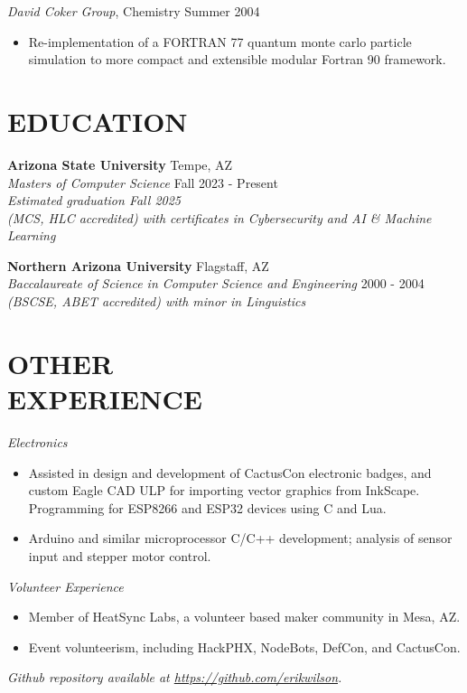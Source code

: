 \documentclass[line,margin]{res}
\begin{document}
\begin{resume}
          {\sl David Coker Group}, Chemistry \hfill Summer 2004
          \begin{itemize} \itemsep -2pt
          \item
            Re-implementation of a FORTRAN 77 quantum monte carlo particle simulation to more compact and extensible modular Fortran 90 framework.
          \end{itemize}

  \section{EDUCATION}
          {\bf Arizona State University} \hfill Tempe, AZ\\
          {\sl Masters of Computer Science} \hfill Fall 2023 - Present\\
          {\sl Estimated graduation Fall 2025}\\
          {\sl (MCS, HLC accredited) with certificates in Cybersecurity and AI \& Machine Learning}

          {\bf Northern Arizona University} \hfill Flagstaff, AZ\\
          {\sl Baccalaureate of Science in Computer Science and Engineering} \hfill 2000 - 2004\\
          {\sl (BSCSE, ABET accredited) with minor in Linguistics}

  \section{OTHER\\EXPERIENCE}
          \emph{Electronics}
          \begin{itemize} \itemsep -2pt
          \item
            Assisted in design and development of CactusCon electronic badges, and custom Eagle CAD ULP for importing
            vector graphics from InkScape. Programming for ESP8266 and ESP32 devices using C and Lua.
          \item
            Arduino and similar microprocessor C/C++ development; analysis of sensor input and stepper motor control.
          \end{itemize}

          \emph{Volunteer Experience}
          \begin{itemize} \itemsep -2pt %
          \item
            Member of HeatSync Labs, a volunteer based maker community in Mesa, AZ.
          \item
            Event volunteerism, including HackPHX, NodeBots, DefCon, and CactusCon.
          \end{itemize}

          \emph{Github repository available at \href{https://github.com/erikwilson}{https://github.com/erikwilson}.}

\end{resume}
\end{document}
